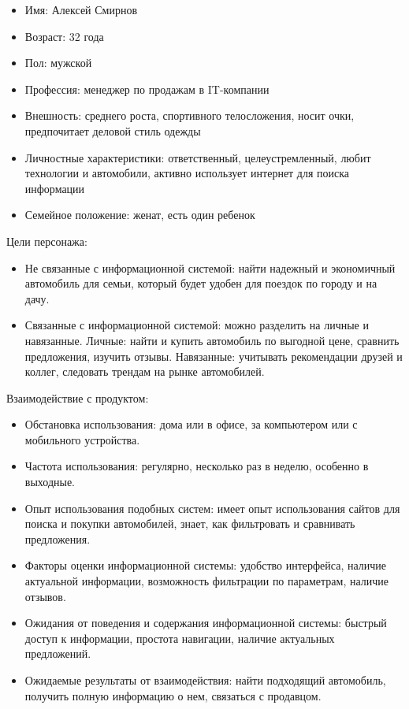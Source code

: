\begin{itemize}
    \item Имя: Алексей Смирнов
    \item Возраст: 32 года
    \item Пол: мужской
    \item Профессия: менеджер по продажам в IT-компании
    \item Внешность: среднего роста, спортивного телосложения, носит очки, предпочитает деловой стиль одежды
    \item Личностные характеристики: ответственный, целеустремленный, любит технологии и автомобили, активно использует интернет для поиска информации
    \item Семейное положение: женат, есть один ребенок
\end{itemize}
\bigskip

Цели персонажа:

\begin{itemize}
    \item Не связанные с информационной системой: найти надежный и экономичный автомобиль для семьи, который будет удобен для поездок по городу и на дачу.

    \item Связанные с информационной системой: можно разделить на личные и навязанные.
            Личные: найти и купить автомобиль по выгодной цене, сравнить предложения, изучить отзывы.
            Навязанные: учитывать рекомендации друзей и коллег, следовать трендам на рынке автомобилей.
\end{itemize}
\bigskip

Взаимодействие с продуктом:

\begin{itemize}
    \item Обстановка использования: дома или в офисе, за компьютером или с мобильного устройства.
    \item Частота использования: регулярно, несколько раз в неделю, особенно в выходные.
    \item Опыт использования подобных систем: имеет опыт использования сайтов для поиска и покупки автомобилей, знает, как фильтровать и сравнивать предложения.
    \item Факторы оценки информационной системы: удобство интерфейса, наличие актуальной информации, возможность фильтрации по параметрам, наличие отзывов.
    \item Ожидания от поведения и содержания информационной системы: быстрый доступ к информации, простота навигации, наличие актуальных предложений.
    \item Ожидаемые результаты от взаимодействия: найти подходящий автомобиль, получить полную информацию о нем, связаться с продавцом.
\end{itemize}
\bigskip

